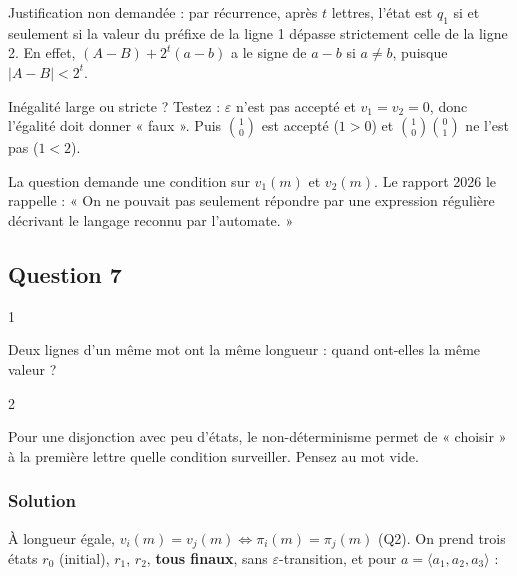 \documentclass[11pt,a4paper]{article}
\begin{document}
Justification non demandée : par récurrence, après \(t\) lettres, l'état est \(q_1\) si et seulement si la valeur du préfixe de la ligne 1 dépasse strictement celle de la ligne 2. En effet, \((A-B)+2^t(a-b)\) a le signe de \(a-b\) si \(a\ne b\), puisque \(|A-B|<2^t\).

\begin{piege}

Inégalité large ou stricte ? Testez : \(\varepsilon\) n'est pas accepté et \(v_1=v_2=0\), donc l'égalité doit donner « faux ». Puis \(\binom10\) est accepté (\(1>0\)) et \(\binom10\binom01\) ne l'est pas (\(1<2\)).

\end{piege}

\begin{jury}

La question demande une condition sur \(v_1(m)\) et \(v_2(m)\). Le rapport 2026 le rappelle : « On ne pouvait pas seulement répondre par une expression régulière décrivant le langage reconnu par l'automate. »

\end{jury}

\hypertarget{question-7}{%
\subsection{Question 7}\label{question-7}}

\begin{indication}{1}

Deux lignes d'un même mot ont la même longueur : quand ont-elles la même valeur ?

\end{indication}

\begin{indication}{2}

Pour une disjonction avec peu d'états, le non-déterminisme permet de « choisir » à la première lettre quelle condition surveiller. Pensez au mot vide.

\end{indication}

\hypertarget{solution-6}{%
\subsubsection{Solution}\label{solution-6}}

À longueur égale, \(v_i(m)=v_j(m)\iff\pi_i(m)=\pi_j(m)\) (Q2). On prend trois états \(r_0\) (initial), \(r_1\), \(r_2\), \textbf{tous finaux}, sans \(\varepsilon\)-transition, et pour \(a=\langle a_1,a_2,a_3\rangle\) :
\end{document}
